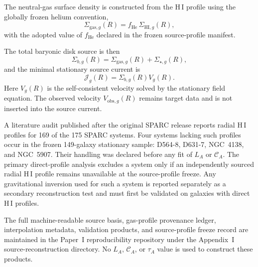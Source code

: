 The neutral-gas surface density is constructed from the H\,I profile using the
globally frozen helium convention,
\begin{equation}
    \Sigma_{\mathrm{gas},g}(R)
    =
    f_{\mathrm{He}}\,
    \Sigma_{\mathrm{HI},g}(R),
    \label{eq:appI-gas-surface-density}
\end{equation}
with the adopted value of $f_{\mathrm{He}}$ declared in the frozen source-profile
manifest.

The total baryonic disk source is then
\begin{equation}
    \Sigma_{b,g}(R)
    =
    \Sigma_{\mathrm{gas},g}(R)
    +
    \Sigma_{\star,g}(R),
    \label{eq:appI-total-baryonic-surface-density}
\end{equation}
and the minimal stationary source current is
\begin{equation}
    \mathcal{J}_g(R)
    =
    \Sigma_{b,g}(R)V_g(R).
    \label{eq:appI-source-current}
\end{equation}
Here $V_g(R)$ is the self-consistent velocity solved by the stationary field
equation. The observed velocity $V_{\mathrm{obs},g}(R)$ remains target data and
is not inserted into the source current.

A literature audit published after the original SPARC release reports radial
H\,I profiles for 169 of the 175 SPARC systems. Four systems lacking such
profiles occur in the frozen 149-galaxy stationary sample: D564-8, D631-7,
NGC~4138, and NGC~5907. Their handling was declared before any fit of
$L_A$ or $\mathcal{C}_A$. The primary direct-profile analysis excludes a system
only if an independently sourced radial H\,I profile remains unavailable at the
source-profile freeze. Any gravitational inversion used for such a system is
reported separately as a secondary reconstruction test and must first be
validated on galaxies with direct H\,I profiles.

The full machine-readable source basis, gas-profile provenance ledger,
interpolation metadata, validation products, and source-profile freeze record
are maintained in the Paper~I reproducibility repository under the Appendix~I
source-reconstruction directory. No $L_A$, $\mathcal{C}_A$, or $\tau_A$ value is
used to construct these products.
